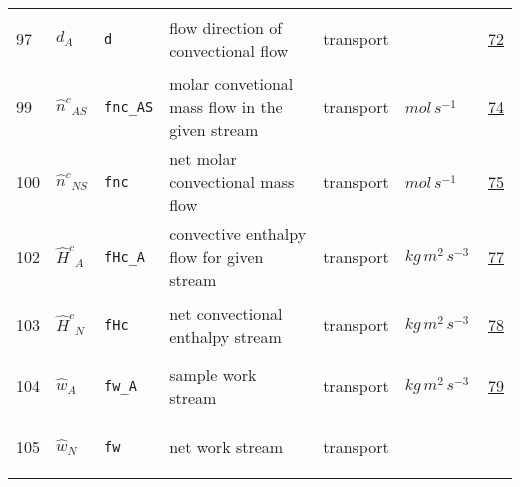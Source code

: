 \begin{longtable}{|p{1cm}|p{2.5cm}|p{4.5cm}|p{8cm}|p{3.0cm}|p{3cm}|p{1cm}|}
    97
             & \hypertarget{"v:97"}{ $ {d}{_{A}} $}
             & \verb|d|
             & flow direction of convectional flow
             & \begin{lay}transport \end{lay}
             & $  $
             & \hyperlink{"e:72"}{ 72 }
                 \\
    99
             & \hypertarget{"v:99"}{ $ {{\hat{n}^c}}{_{{A S}}} $}
             & \verb|fnc_AS|
             & molar convetional mass flow in the given stream
             & \begin{lay}transport \end{lay}
             & $ mol \,s^{-1} \, $
             & \hyperlink{"e:74"}{ 74 }
                 \\
    100
             & \hypertarget{"v:100"}{ $ {{\hat{n}^c}}{_{{N S}}} $}
             & \verb|fnc|
             & net molar convectional mass flow
             & \begin{lay}transport \end{lay}
             & $ mol \,s^{-1} \, $
             & \hyperlink{"e:75"}{ 75 }
                 \\
    102
             & \hypertarget{"v:102"}{ $ {{\hat{H}^c}}{_{A}} $}
             & \verb|fHc_A|
             & convective enthalpy flow for given stream
             & \begin{lay}transport \end{lay}
             & $ kg \,m^{2} \,s^{-3} \, $
             & \hyperlink{"e:77"}{ 77 }
                 \\
    103
             & \hypertarget{"v:103"}{ $ {{\hat{H}^c}}{_{N}} $}
             & \verb|fHc|
             & net convectional enthalpy stream
             & \begin{lay}transport \end{lay}
             & $ kg \,m^{2} \,s^{-3} \, $
             & \hyperlink{"e:78"}{ 78 }
                 \\
    104
             & \hypertarget{"v:104"}{ $ {{\hat{w}}}{_{A}} $}
             & \verb|fw_A|
             & sample work stream
             & \begin{lay}transport \end{lay}
             & $ kg \,m^{2} \,s^{-3} \, $
             & \hyperlink{"e:79"}{ 79 }
                 \\
    105
             & \hypertarget{"v:105"}{ $ {{\hat{w}}}{_{N}} $}
             & \verb|fw|
             & net work stream
             & \begin{lay}transport \end{lay}

\end{longtable}

